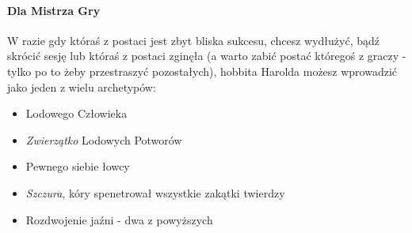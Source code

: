 \documentclass[12pt,a4paper]{article}
\begin{document}
\paragraph{ \color{red} Dla Mistrza Gry}
W razie gdy któraś z postaci jest zbyt bliska sukcesu, chcesz
wydłużyć, bądź skrócić sesję lub któraś z postaci zginęła (a warto
zabić postać któregoś z graczy - tylko po to żeby przestraszyć
pozostałych), hobbita Harolda możesz wprowadzić jako jeden z wielu
archetypów:
\begin{itemize}
\item Lodowego Człowieka
\item \emph{Zwierzątko} Lodowych Potworów
\item Pewnego siebie łowcy
\item \emph{Szczura}, kóry spenetrował wszystkie zakątki twierdzy
\item Rozdwojenie jaźni - dwa z powyższych
\end{itemize}
\end{document}
